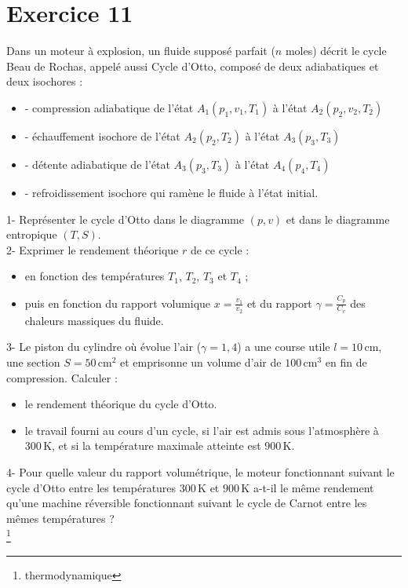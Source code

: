 \documentclass[a4paper,12pt]{article}
\begin{document}
	\section*{Exercice 11}
	Dans un moteur à explosion, un fluide supposé parfait ($n$ moles) décrit le cycle Beau de Rochas, appelé aussi Cycle d'Otto, composé de deux adiabatiques et deux isochores :
	\begin{itemize}
		\item - compression adiabatique de l'état $A_1(p_1, v_1, T_1)$ à l'état $A_2(p_2, v_2, T_2)$
		\item - échauffement isochore de l'état $A_2(p_2, T_2)$ à l'état $A_3(p_3, T_3)$
		\item - détente adiabatique de l'état $A_3(p_3, T_3)$ à l'état $A_4(p_4, T_4)$
		\item - refroidissement isochore qui ramène le fluide à l'état initial.
	\end{itemize}
	1- Représenter le cycle d'Otto dans le diagramme $(p, v)$ et dans le diagramme entropique $(T, S)$.\\
	2- Exprimer le rendement théorique $r$ de ce cycle :
	\begin{itemize}
		\item[a)] en fonction des températures $T_1$, $T_2$, $T_3$ et $T_4$ ;
		\item[b)] puis en fonction du rapport volumique $x = \frac{v_1}{v_2}$ et du rapport $\gamma = \frac{C_p}{C_v}$ des chaleurs massiques du fluide.
	\end{itemize}
	3- Le piston du cylindre où évolue l'air ($\gamma = 1{,}4$) a une course utile $l = 10\,\text{cm}$, une section $S = 50\,\text{cm}^2$ et emprisonne un volume d'air de $100\,\text{cm}^3$ en fin de compression. Calculer :
	\begin{itemize}
		\item[a)] le rendement théorique du cycle d'Otto.
		\item[b)] le travail fourni au cours d'un cycle, si l'air est admis sous l'atmosphère à $300\,\text{K}$, et si la température maximale atteinte est $900\,\text{K}$.
	\end{itemize}
	4- Pour quelle valeur du rapport volumétrique, le moteur fonctionnant suivant le cycle d'Otto entre les températures $300\,\text{K}$ et $900\,\text{K}$ a-t-il le même rendement qu'une machine réversible fonctionnant suivant le cycle de Carnot entre les mêmes températures ?   
	\\ 
	
	\footnote{thermodynamique} 
	
\end{document}

